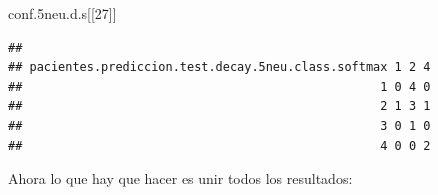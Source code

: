 \documentclass[]{article}
\newenvironment{Shaded}{\begin{snugshade}}{\end{snugshade}}
\newcommand{\DecValTok}[1]{\textcolor[rgb]{0.00,0.00,0.81}{#1}}
\newcommand{\FloatTok}[1]{\textcolor[rgb]{0.00,0.00,0.81}{#1}}
\newcommand{\NormalTok}[1]{#1}
\begin{document}
\begin{Shaded}
\begin{Highlighting}[]
\NormalTok{conf}\FloatTok{.5}\NormalTok{neu.d.s[[}\DecValTok{27}\NormalTok{]]}
\end{Highlighting}
\end{Shaded}

\begin{verbatim}
##                                                   
## pacientes.prediccion.test.decay.5neu.class.softmax 1 2 4
##                                                  1 0 4 0
##                                                  2 1 3 1
##                                                  3 0 1 0
##                                                  4 0 0 2
\end{verbatim}

Ahora lo que hay que hacer es unir todos los resultados:
\end{document}
